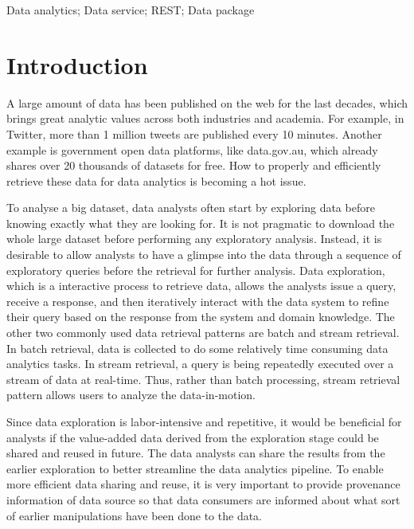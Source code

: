 \documentclass[10pt, conference, compsocconf]{IEEEtran}
\begin{document}
\begin{IEEEkeywords}
Data analytics; Data service; REST; Data package

\end{IEEEkeywords}

\IEEEpeerreviewmaketitle



\section{Introduction}
A large amount of data has been published on the web for the last decades, which brings great analytic values across both industries and academia. For example, in Twitter, more than 1 million tweets are published every 10 minutes. Another example is government open data platforms, like data.gov.au\cite{dataGov}, which already shares over 20 thousands of datasets for free. How to properly and efficiently retrieve these data for data analytics is becoming a hot issue\cite{jagadish2014big}\cite{sharda2014businesss}.

To analyse a big dataset, data analysts often start by exploring data before knowing exactly what they are looking for. It is not pragmatic to download the whole large dataset before performing any exploratory analysis. Instead, it is desirable to allow analysts to have a glimpse into the data through a sequence of exploratory queries before the retrieval for further analysis\cite{khan2014divide}. Data exploration,
which is a interactive process to retrieve data, allows the analysts issue a query, receive a response, and then iteratively interact with the data system to refine their query based on the response from the system and domain knowledge\cite{idreos2015overview}. The other two commonly used data retrieval patterns are batch and stream retrieval. In batch retrieval, data is collected to do some relatively time consuming data analytics tasks. In stream retrieval, a query is being repeatedly executed over a stream of data at real-time. Thus, rather than batch processing, stream retrieval pattern allows users to analyze the data-in-motion. 

Since data exploration is labor-intensive and repetitive, it would be beneficial for analysts if the value-added data derived from the exploration stage could be shared and reused in future. The data analysts can share the results from the earlier exploration to better streamline the data analytics pipeline. To enable more efficient data sharing and reuse, it is very important to provide provenance information of data source so that data consumers are informed about what sort of earlier manipulations have been done to the data.
\end{document}
